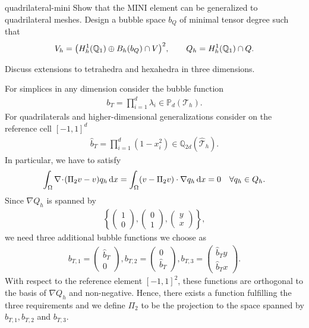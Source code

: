 \begin{Problem}{quadrilateral-mini}
  Show that the MINI element can be generalized to quadrilateral
  meshes. Design a bubble space $b_Q$ of minimal tensor degree such that
  \begin{gather*}
    V_h = \bigl(H^1_h(\mathbb Q_1) \oplus B_h(b_Q) \cap V\bigr)^2,
    \qquad
    Q_h = H^1_h(\mathbb Q_1) \cap Q.
  \end{gather*}

  Discuss extensions to tetrahedra and hexahedra in three dimensions.
\begin{solution}
  For simplices in any dimension consider the bubble function
  \begin{align*}
    b_T=\prod_{i=1}^d\lambda_i\in \mathbb{P}_d(\mathcal{T}_h).
  \end{align*}
  For quadrilaterals and higher-dimensional generalizations consider
  on the reference cell $[-1,1]^d$
  \begin{align*}
    \hat{b}_T=\prod_{i=1}^d(1-x_i^2)\in \mathbb{Q}_{2d}(\hat{\mathcal{T}}_h).
  \end{align*}
  In particular, we have to satisfy
  \begin{gather*}
    \int_\Omega \nabla\!\cdot\!(\Pi_2 v-v) q_h \,\mathrm{d} x
    = \int_\Omega (v-\Pi_2v)\cdot\nabla q_h\,\mathrm{d} x
    = 0 \quad \forall q_h\in Q_h.
  \end{gather*}
  Since $\nabla Q_h$ is spanned by
  \begin{align*}
    \left\{
      \begin{pmatrix} 1 \\0 \end{pmatrix},
      \begin{pmatrix} 0 \\1 \end{pmatrix},
      \begin{pmatrix} y \\x \end{pmatrix}
    \right\},
  \end{align*}
  we need three additional bubble functions we choose as
  \begin{align*}
    b_{T,1}= \begin{pmatrix} \hat{b}_T   \\ 0         \end{pmatrix},
    b_{T,2}= \begin{pmatrix}         0   \\ \hat{b}_T \end{pmatrix},
    b_{T,3}= \begin{pmatrix} \hat{b}_T y \\ \hat{b}_T x \end{pmatrix}.
  \end{align*}
  With respect to the reference element $[-1,1]^2$, these functions are orthogonal
  to the basis of $\nabla Q_h$ and non-negative. Hence, there exists a function
  fulfilling the three requirements and we define $\Pi_2$ to be the projection to the
  space spanned by $b_{T,1}, b_{T,2}$ and $b_{T,3}$.
\end{solution}
\end{Problem}


